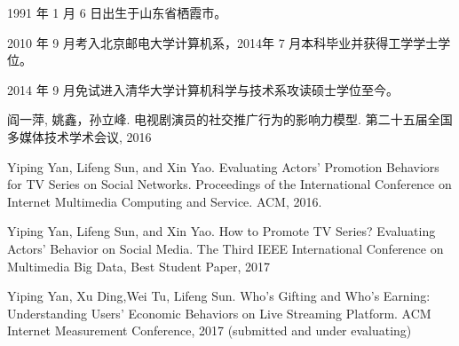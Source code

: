 \begin{resume}


  1991 年 1 月 6 日出生于山东省栖霞市。

  2010 年 9 月考入北京邮电大学计算机系，2014年 7 月本科毕业并获得工学学士学位。

  2014 年 9 月免试进入清华大学计算机科学与技术系攻读硕士学位至今。

\begin{publications}
  \item 阎一萍, 姚鑫，孙立峰. 电视剧演员的社交推广行为的影响力模型. 第二十五届全国多媒体技术学术会议, 2016
  \item Yiping Yan, Lifeng Sun, and Xin Yao. Evaluating Actors' Promotion Behaviors for TV Series on Social Networks. Proceedings of the International Conference on Internet Multimedia Computing and Service. ACM, 2016.
  \item Yiping Yan, Lifeng Sun, and Xin Yao. How to Promote TV Series? Evaluating Actors’ Behavior on Social Media. The Third IEEE International Conference on Multimedia Big Data, Best Student Paper, 2017
\item Yiping Yan, Xu Ding,Wei Tu, Lifeng Sun. Who’s Gifting and Who’s Earning: Understanding Users’ Economic Behaviors on Live Streaming Platform. ACM Internet Measurement Conference, 2017 (submitted and under evaluating)
  \end{publications}

\end{resume}
